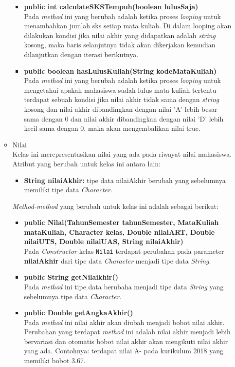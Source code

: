 \begin{enumerate}
\begin{itemize}
\begin{itemize}
					\item \textbf{public int calculateSKSTempuh(boolean lulusSaja)}\\
						Pada \textit{method} ini yang berubah adalah ketika proses \textit{looping} untuk menambahkan jumlah sks setiap mata kuliah. Di dalam looping akan dilakukan kondisi jika nilai akhir yang didapatkan adalah \textit{string} kosong, maka baris selanjutnya tidak akan dikerjakan kemudian dilanjutkan dengan iterasi berikutnya.
					
					\item \textbf{public boolean hasLulusKuliah(String kodeMataKuliah)}\\
						Pada \textit{method} ini yang berubah adalah ketika proses \textit{looping} untuk mengetahui apakah mahasiswa sudah lulus mata kuliah tertentu terdapat sebuah kondisi jika nilai akhir tidak sama dengan \textit{string} kosong dan nilai akhir dibandingkan dengan nilai 'A' lebih besar sama dengan 0 dan nilai akhir dibandingkan dengan nilai 'D' lebih kecil sama dengan 0, maka akan mengembalikan nilai true.
		\end{itemize}
			
				\item Nilai\\
				Kelas ini merepresentasikan nilai yang ada pada riwayat nilai mahasiswa. Atribut yang berubah untuk kelas ini antara lain:
				\begin{itemize}
					\item \textbf{String nilaiAkhir:} tipe data nilaiAkhir berubah yang sebelumnya memiliki tipe data \textit{Character}.
				\end{itemize}
			\textit{Method-method} yang berubah untuk kelas ini adalah sebagai berikut:
				\begin{itemize}
					\item \textbf{public Nilai(TahunSemester tahunSemester, MataKuliah mataKuliah, Character kelas, Double nilaiART, Double nilaiUTS, Double nilaiUAS, String nilaiAkhir)}\\
						Pada \textit{Constructor} kelas \texttt{Nilai} terdapat perubahan pada parameter \textbf{nilaiAkhir} dari tipe data \textit{Character} menjadi tipe data \textit{String}.
						
					\item \textbf{public String getNilaikhir()}\\
						Pada \textit{method} ini tipe data berubaha menjadi tipe data \textit{String} yang sebelumnya tipe data \textit{Character}.
					
					\item \textbf{public Double getAngkaAkhir()}\\
						Pada \textit{method} ini nilai akhir akan diubah menjadi bobot nilai akhir. Perubahan yang terdapat \textit{method} ini adalah nilai akhir menjadi lebih bervariasi dan otomatis bobot nilai akhir akan mengikuti nilai akhir yang ada. Contohnya: terdapat nilai A- pada kurikulum 2018 yang memiliki bobot 3.67. 
				\end{itemize}
		\end{itemize}
\end{enumerate}